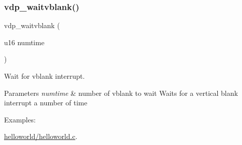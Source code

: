 \subsubsection{\texorpdfstring{vdp\+\_\+waitvblank()}{vdp\_waitvblank()}}
{\footnotesize\ttfamily vdp\+\_\+waitvblank (\begin{DoxyParamCaption}\item[{u16}]{numtime }\end{DoxyParamCaption})}



Wait for vblank interrupt. 


\begin{DoxyParams}{Parameters}
{\em numtime} & number of vblank to wait Waits for a vertical blank interrupt a number of time \\
\hline
\end{DoxyParams}
\begin{Desc}
\item[Examples\+: ]\par
\hyperlink{a00063}{helloworld/helloworld.\+c}.\end{Desc}
